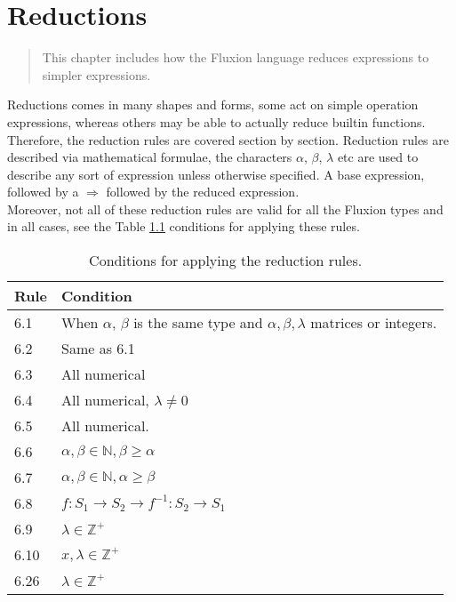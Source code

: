 \documentclass[11pt,a4paper]{book}
\begin{document}
\chapter{Reductions}

\vspace{1em}
\begin{quotation}
This chapter includes how the Fluxion language reduces expressions to simpler expressions.
\end{quotation}
\newpage

Reductions comes in many shapes and forms, some act on simple operation expressions, whereas others may be able to actually reduce builtin functions. Therefore, the reduction rules are covered section by section. Reduction rules are described via mathematical formulae, the characters $\alpha$, $\beta$, $\lambda$ etc are used to describe any sort of expression unless otherwise specified. A base expression, followed by a $\Rightarrow$ followed by the reduced expression. \\

Moreover, not all of these reduction rules are valid for all the Fluxion types and in all cases, see the Table \ref{tab:reductionruledomains} conditions for applying these rules.

\begin{table}[htbb]
\label{tab:reductionruledomains}
\begin{tabular}{ll}
\toprule
Rule & Condition \\
\midrule
6.1 & When $\alpha$, $\beta$ is the same type and $\alpha, \beta, \lambda$ matrices or integers. \\
6.2 & Same as 6.1 \\
6.3 & All numerical \\
6.4 & All numerical, $\lambda \neq 0$ \\
6.5 & All numerical. \\
6.6 & $\alpha, \beta \in \mathbb{N}, \beta \geq \alpha$ \\
6.7 & $\alpha, \beta \in \mathbb{N}, \alpha \geq \beta$ \\
6.8 & $f: S_1 \rightarrow S_2 \rightarrow f^{-1}: S_2 \rightarrow S_1$ \\
6.9 & $\lambda \in \mathbb{Z^+}$ \\
6.10 & $x, \lambda \in \mathbb{Z^+}$ \\
6.26 & $\lambda \in \mathbb{Z^+}$ \\
\bottomrule
\end{tabular}
\caption{Conditions for applying the reduction rules.}
\end{table}
\end{document}
